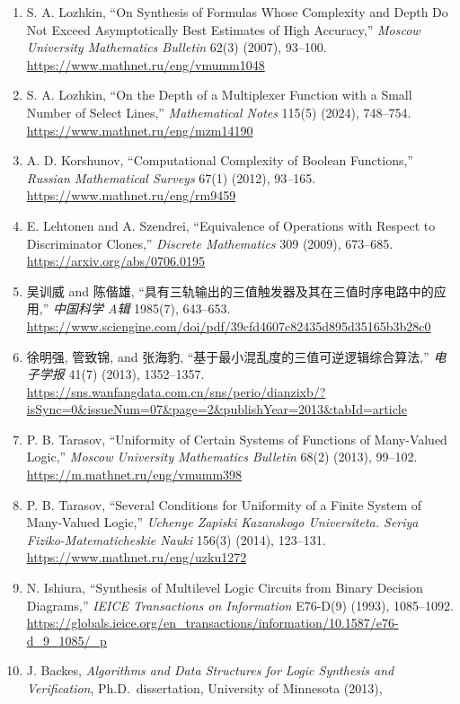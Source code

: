 \documentclass[
  11pt,
]{article}
\theoremstyle{definition}
\theoremstyle{remark}
\begin{document}
\begin{enumerate}
  \url{https://keldysh.ru/papers/2004/mvk/mvk2004_223.pdf}
\item
  S. A. Lozhkin, ``On Synthesis of Formulas Whose Complexity and Depth
  Do Not Exceed Asymptotically Best Estimates of High Accuracy,''
  \emph{Moscow University Mathematics Bulletin} 62(3) (2007), 93--100.
  \url{https://www.mathnet.ru/eng/vmumm1048}
\item
  S. A. Lozhkin, ``On the Depth of a Multiplexer Function with a Small
  Number of Select Lines,'' \emph{Mathematical Notes} 115(5) (2024),
  748--754. \url{https://www.mathnet.ru/eng/mzm14190}
\item
  A. D. Korshunov, ``Computational Complexity of Boolean Functions,''
  \emph{Russian Mathematical Surveys} 67(1) (2012), 93--165.
  \url{https://www.mathnet.ru/eng/rm9459}
\item
  E. Lehtonen and A. Szendrei, ``Equivalence of Operations with Respect
  to Discriminator Clones,'' \emph{Discrete Mathematics} 309 (2009),
  673--685. \url{https://arxiv.org/abs/0706.0195}
\item
  吴训威 and 陈偕雄,
  ``具有三轨输出的三值触发器及其在三值时序电路中的应用,'' \emph{中国科学
  A辑} 1985(7), 643--653.
  \url{https://www.sciengine.com/doi/pdf/39cfd4607c82435d895d35165b3b28c0}
\item
  徐明强, 管致锦, and 张海豹, ``基于最小混乱度的三值可逆逻辑综合算法,''
  \emph{电子学报} 41(7) (2013), 1352--1357.
  \url{https://sns.wanfangdata.com.cn/sns/perio/dianzixb/?isSync=0\&issueNum=07\&page=2\&publishYear=2013\&tabId=article}
\item
  P. B. Tarasov, ``Uniformity of Certain Systems of Functions of
  Many-Valued Logic,'' \emph{Moscow University Mathematics Bulletin}
  68(2) (2013), 99--102. \url{https://m.mathnet.ru/eng/vmumm398}
\item
  P. B. Tarasov, ``Several Conditions for Uniformity of a Finite System
  of Many-Valued Logic,'' \emph{Uchenye Zapiski Kazanskogo Universiteta.
  Seriya Fiziko-Matematicheskie Nauki} 156(3) (2014), 123--131.
  \url{https://www.mathnet.ru/eng/uzku1272}
\item
  N. Ishiura, ``Synthesis of Multilevel Logic Circuits from Binary
  Decision Diagrams,'' \emph{IEICE Transactions on Information} E76-D(9)
  (1993), 1085--1092.
  \url{https://globals.ieice.org/en_transactions/information/10.1587/e76-d_9_1085/_p}
\item
  J. Backes, \emph{Algorithms and Data Structures for Logic Synthesis
  and Verification}, Ph.D.~dissertation, University of Minnesota (2013),

\end{enumerate}
\end{document}

